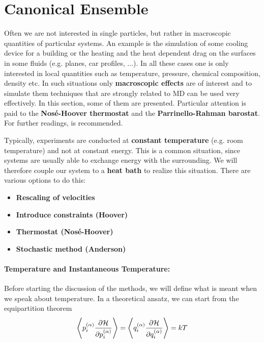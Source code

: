 
\chapter{Canonical Ensemble}

Often we are not interested in single particles, but rather in macroscopic quantities of particular systems. An example is the simulation of some cooling device for a building or the heating and the heat dependent drag on the surfaces in some fluids (e.g. planes, car profiles, ...). In all these cases one is only interested in local quantities such as temperature, pressure, chemical composition, density etc. In such situations only \textbf{macroscopic effects} are of interest and to simulate them  techniques that are strongly related to MD can be used very effectively. In this section, some of them are presented. Particular attention is paid to the \textbf{Nos\'e-Hoover thermostat} and the \textbf{Parrinello-Rahman barostat}. For further readings,  \citet{sim_liq} is recommended.

\vspace{0.6cm}
Typically, experiments are conducted at \textbf{constant temperature} (e.g. room temperature) and not at constant energy. This is a common situation, since systems are usually able to exchange energy with the surrounding. We will therefore couple our system to a \textbf{heat bath} to realize this situation. There are various options to do this:

\begin{itemize}
\item \textbf{Rescaling of velocities}
\item \textbf{Introduce constraints (Hoover)}
\item \textbf{Thermostat (Nos\'e-Hoover)}
\item \textbf{Stochastic method (Anderson)}
\end{itemize}

\vspace{.8cm}

\subsubsection*{Temperature and Instantaneous Temperature:}
Before starting the discussion of the methods, we will define what is meant when we speak about temperature. In a theoretical ansatz, we can start from the equipartition theorem
\begin{equation}
\left<p_i^{\left(\alpha\right)} \frac{\partial \mathcal{H}}{\partial p_i^{\left(\alpha\right)}}\right> = \left<q_i^{\left(\alpha\right)} \frac{\partial \mathcal{H}}{\partial q_i^{\left(\alpha\right)}}\right> = kT
\label{eq:equipartition}
\end{equation}

